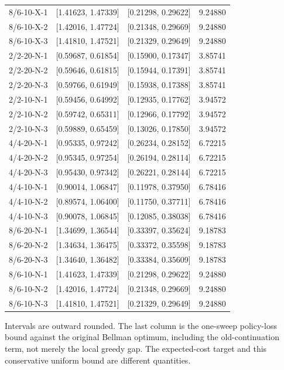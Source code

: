 \begin{longtable}{lccr}
8/6-10-X-1 & [1.41623, 1.47339] & [0.21298, 0.29622] & 9.24880 \\
8/6-10-X-2 & [1.42016, 1.47724] & [0.21348, 0.29669] & 9.24880 \\
8/6-10-X-3 & [1.41810, 1.47521] & [0.21329, 0.29649] & 9.24880 \\
2/2-20-N-1 & [0.59687, 0.61854] & [0.15900, 0.17347] & 3.85741 \\
2/2-20-N-2 & [0.59646, 0.61815] & [0.15944, 0.17391] & 3.85741 \\
2/2-20-N-3 & [0.59766, 0.61949] & [0.15938, 0.17388] & 3.85741 \\
2/2-10-N-1 & [0.59456, 0.64992] & [0.12935, 0.17762] & 3.94572 \\
2/2-10-N-2 & [0.59742, 0.65311] & [0.12966, 0.17792] & 3.94572 \\
2/2-10-N-3 & [0.59889, 0.65459] & [0.13026, 0.17850] & 3.94572 \\
4/4-20-N-1 & [0.95335, 0.97242] & [0.26234, 0.28152] & 6.72215 \\
4/4-20-N-2 & [0.95345, 0.97254] & [0.26194, 0.28114] & 6.72215 \\
4/4-20-N-3 & [0.95430, 0.97342] & [0.26221, 0.28144] & 6.72215 \\
4/4-10-N-1 & [0.90014, 1.06847] & [0.11978, 0.37950] & 6.78416 \\
4/4-10-N-2 & [0.89574, 1.06400] & [0.11750, 0.37711] & 6.78416 \\
4/4-10-N-3 & [0.90078, 1.06845] & [0.12085, 0.38038] & 6.78416 \\
8/6-20-N-1 & [1.34699, 1.36544] & [0.33397, 0.35624] & 9.18783 \\
8/6-20-N-2 & [1.34634, 1.36475] & [0.33372, 0.35598] & 9.18783 \\
8/6-20-N-3 & [1.34640, 1.36482] & [0.33384, 0.35609] & 9.18783 \\
8/6-10-N-1 & [1.41623, 1.47339] & [0.21298, 0.29622] & 9.24880 \\
8/6-10-N-2 & [1.42016, 1.47724] & [0.21348, 0.29669] & 9.24880 \\
8/6-10-N-3 & [1.41810, 1.47521] & [0.21329, 0.29649] & 9.24880 \\
\end{longtable}
\endgroup
{\footnotesize Intervals are outward rounded. The last column is the one-sweep policy-loss bound against the original Bellman optimum, including the old-continuation term, not merely the local greedy gap. The expected-cost target and this conservative uniform bound are different quantities.}
